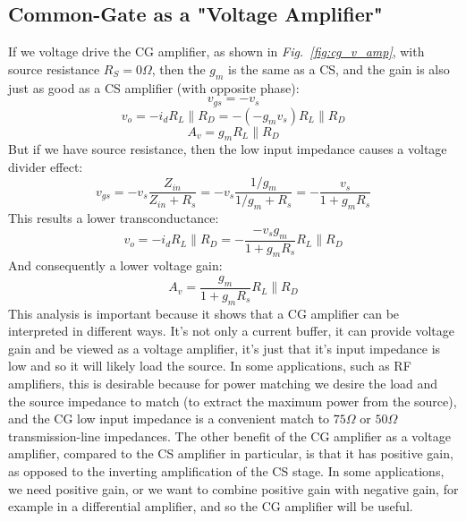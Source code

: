 \subsection{Common-Gate as a "Voltage Amplifier"}
If we voltage drive the CG amplifier, as shown in \emph{Fig.~\ref{fig:cg_v_amp}}, with source resistance $R_S = 0\Omega$, then the $g_m$ is the same as a CS, and the gain is also just as good as a CS amplifier (with opposite phase):
    \begin{equation}
        v_{gs} = -v_s 
    \end{equation}
    \begin{equation}
        v_{o} = - i_d R_L \parallel R_D =  - (-g_m v_s) R_L \parallel R_D 
    \end{equation}
    \begin{equation}
        A_v = g_m R_L \parallel R_D
    \end{equation}
But if we have source resistance, then the low input impedance causes a voltage divider effect:
    \begin{equation}
        v_{gs} = -v_s \frac{Z_{in}}{Z_{in} + R_s} = -v_s \frac{1/g_m}{1/g_m + R_s} = - \frac{v_s}{1 + g_m R_s}
    \end{equation}
This results a lower transconductance:
    \begin{equation}
        v_{o} = - i_d R_L \parallel R_D =  - \frac{-v_s g_m }{1 + g_m R_s} R_L \parallel R_D 
    \end{equation}
And consequently a lower voltage gain: 
    \begin{equation}
        A_v = \frac{g_m }{1 + g_m R_s} R_L \parallel R_D
    \end{equation}
This analysis is important because it shows that a CG amplifier can be interpreted in different ways.  It's not only a current buffer, it can provide voltage gain and be viewed as a voltage amplifier, it's just that it's input impedance is low and so it will likely load the source.  In some applications, such as RF amplifiers, this is desirable because for power matching we desire the load and the source impedance to match (to extract the maximum power from the source), and the CG low input impedance is a convenient match to $75\Omega$ or $50\Omega$ transmission-line impedances.  The other benefit of the CG amplifier as a voltage amplifier, compared to the CS amplifier in particular, is that it has positive gain, as opposed to the inverting amplification of the CS stage.  In some applications, we need positive gain, or we want to combine positive gain with negative gain, for example in a differential amplifier, and so the CG amplifier will be useful.
